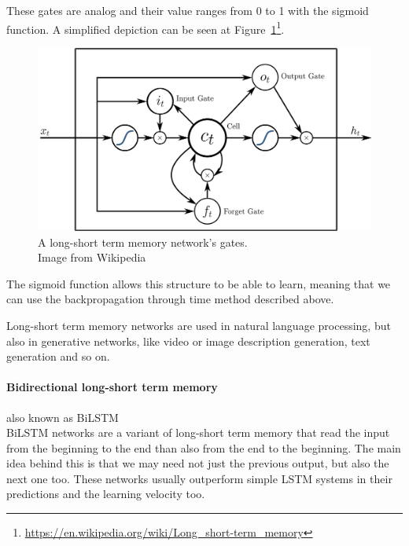 These gates are analog and their value ranges from 0 to 1 with the sigmoid function. A simplified depiction can be seen at Figure~\ref{fig:lstm}\footnote{\url{https://en.wikipedia.org/wiki/Long_short-term_memory}}.
\begin{figure}[!htb]
	\centering
	\includegraphics[scale=0.2]{lstm.jpg}
	\caption{A long-short term memory network's gates.\\Image from Wikipedia}
	\label{fig:lstm}
\end{figure}
\FloatBarrier

The sigmoid function allows this structure to be able to learn, meaning that we can use the backpropagation through time method described above.

Long-short term memory networks are used in natural language processing, but also in generative networks, like video or image description generation, text generation and so on.

\paragraph*{Bidirectional long-short term memory} also known as BiLSTM\\
BiLSTM networks are a variant of long-short term memory that read the input from the beginning to the end than also from the end to the beginning. The main idea behind this is that we may need not just the previous output, but also the next one too. These networks usually outperform simple LSTM systems in their predictions and the learning velocity too.


